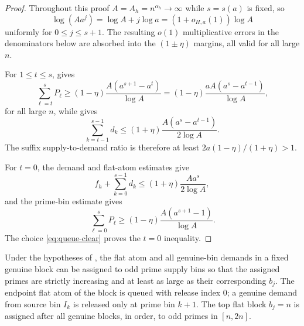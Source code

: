 \begin{proof}
Throughout this proof $A=A_h=n^{\alpha_h}\to\infty$ while $s=s(a)$ is fixed,
so
\[
  \log(Aa^j)=\log A+j\log a=(1+o_{H,a}(1))\log A
\]
uniformly for $0\le j\le s+1$.  The resulting $o(1)$ multiplicative errors in
the denominators below are absorbed into the $(1\pm\eta)$ margins, all valid
for all large $n$.

For $1\le t\le s$,  gives
\[
  \sum_{\ell=t}^{s}P_\ell
  \ge
  (1-\eta)\frac{A(a^{s+1}-a^t)}{\log A}
  =
  (1-\eta)\frac{aA(a^s-a^{t-1})}{\log A},
\]
for all large $n$, while  gives
\[
  \sum_{k=t-1}^{s-1}d_k
  \le
  (1+\eta)\frac{A(a^s-a^{t-1})}{2\log A}.
\]
The suffix supply-to-demand ratio is therefore at least
$2a(1-\eta)/(1+\eta)>1$.

For $t=0$, the demand and flat-atom estimates give
\[
  f_h+\sum_{k=0}^{s-1}d_k
  \le
  (1+\eta)\frac{Aa^s}{2\log A},
\]
and the prime-bin estimate gives
\[
  \sum_{\ell=0}^{s}P_\ell
  \ge
  (1-\eta)\frac{A(a^{s+1}-1)}{\log A}.
\]
The choice \eqref{eq:queue-clear} proves the $t=0$ inequality.
\end{proof}

\begin{lemma}\label{lem:monotone-prime-assignment}
Under the hypotheses of , the flat atom
and all genuine-bin demands in a fixed genuine block can be assigned to odd
prime supply bins so that the assigned primes are strictly increasing and at
least as large as their corresponding $b_j$.  The endpoint flat atom of the
block is queued with release index $0$; a genuine demand from source bin $I_k$
is released only at prime bin $k+1$.  The top flat block $b_j=n$ is assigned
after all genuine blocks, in order, to odd primes in $[n,2n]$.
\end{lemma}

